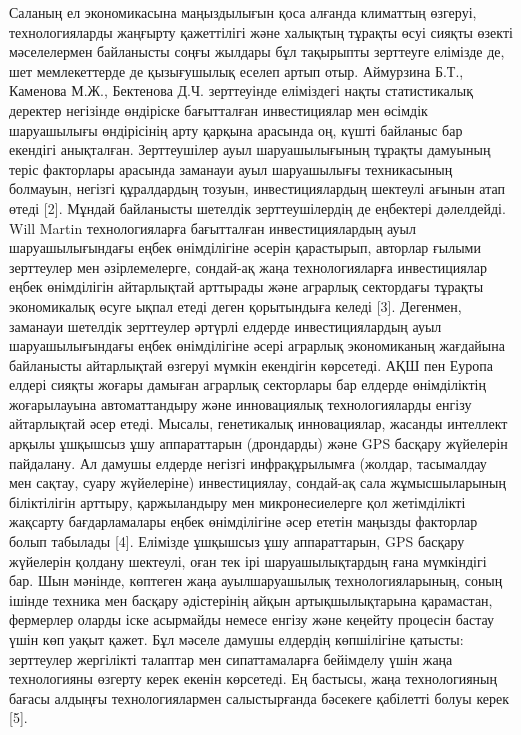 \begin{multicols}{2}
Саланың ел экономикасына маңыздылығын қоса алғанда климаттың өзгеруі,
технологияларды жаңғырту қажеттілігі және халықтың тұрақты өсуі сияқты
өзекті мәселелермен байланысты соңғы жылдары бұл тақырыпты зерттеуге
елімізде де, шет мемлекеттерде де қызығушылық еселеп артып отыр.
Аймурзина Б.Т., Каменова М.Ж., Бектенова Д.Ч. зерттеуінде еліміздегі
нақты статистикалық деректер негізінде өндіріске бағытталған
инвестициялар мен өсімдік шаруашылығы өндірісінің арту қарқына арасында
оң, күшті байланыс бар екендігі анықталған. Зерттеушілер ауыл
шаруашылығының тұрақты дамуының теріс факторлары арасында заманауи ауыл
шаруашылығы техникасының болмауын, негізгі құралдардың тозуын,
инвестициялардың шектеулі ағынын атап өтеді {[}2{]}. Мұндай байланысты
шетелдік зерттеушілердің де еңбектері дәлелдейді. Will Martin
технологияларға бағытталған инвестициялардың ауыл шаруашылығындағы еңбек
өнімділігіне әсерін қарастырып, авторлар ғылыми зерттеулер мен
әзірлемелерге, сондай-ақ жаңа технологияларға инвестициялар еңбек
өнімділігін айтарлықтай арттырады және аграрлық сектордағы тұрақты
экономикалық өсуге ықпал етеді деген қорытындыға келеді {[}3{]}.
Дегенмен, заманауи шетелдік зерттеулер әртүрлі елдерде инвестициялардың
ауыл шаруашылығындағы еңбек өнімділігіне әсері аграрлық экономиканың
жағдайына байланысты айтарлықтай өзгеруі мүмкін екендігін көрсетеді. АҚШ
пен Еуропа елдері сияқты жоғары дамыған аграрлық секторлары бар елдерде
өнімділіктің жоғарылауына автоматтандыру және инновациялық
технологияларды енгізу айтарлықтай әсер етеді. Мысалы, генетикалық
инновациялар, жасанды интеллект арқылы ұшқышсыз ұшу аппараттарын
(дрондарды) және GPS басқару жүйелерін пайдалану. Ал дамушы елдерде
негізгі инфрақұрылымға (жолдар, тасымалдау мен сақтау, суару жүйелеріне)
инвестициялау, сондай-ақ сала жұмысшыларының біліктілігін арттыру,
қаржыландыру мен микронесиелерге қол жетімділікті жақсарту
бағдарламалары еңбек өнімділігіне әсер ететін маңызды факторлар болып
табылады {[}4{]}. Елімізде ұшқышсыз ұшу аппараттарын, GPS басқару
жүйелерін қолдану шектеулі, оған тек ірі шаруашылықтардың ғана
мүмкіндігі бар. Шын мәнінде, көптеген жаңа ауылшаруашылық
технологияларының, соның ішінде техника мен басқару әдістерінің айқын
артықшылықтарына қарамастан, фермерлер оларды іске асырмайды немесе
енгізу және кеңейту процесін бастау үшін көп уақыт қажет. Бұл мәселе
дамушы елдердің көпшілігіне қатысты: зерттеулер жергілікті талаптар мен
сипаттамаларға бейімделу үшін жаңа технологияны өзгерту керек екенін
көрсетеді. Ең бастысы, жаңа технологияның бағасы алдыңғы
технологиялармен салыстырғанда бәсекеге қабілетті болуы керек {[}5{]}.


\end{multicols}

